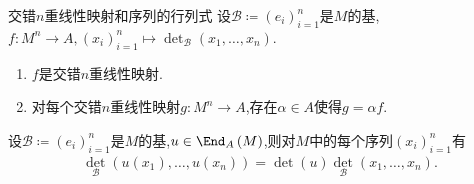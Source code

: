 \begin{proposition}{交错$n$重线性映射和序列的行列式}{}
	设$\mathcal{B}\coloneq\left(e_{i}\right)_{i=1}^{n}$是$M$的基,$f:M^{n}\to A,\left(x_{i}\right)_{i=1}^{n}\mapsto\det_{\mathcal{B}}\left(x_{1},\ldots,x_{n}\right)$.
	\begin{enumerate}
		\item $f$是交错$n$重线性映射.
		\item 对每个交错$n$重线性映射$g:M^{n}\to A$,存在$\alpha\in A$使得$g=\alpha f$.
	\end{enumerate}
\end{proposition}

\begin{proposition}{}{}
	设$\mathcal{B}\coloneq\left(e_{i}\right)_{i=1}^{n}$是$M$的基,$u\in\End_{A}\left(M\right)$,则对$M$中的每个序列$\left(x_{i}\right)_{i=1}^{n}$有
	\begin{align*}
		\det_{\mathcal{B}}\left(u\left(x_{1}\right),\ldots,u\left(x_{n}\right)\right)=\det\left(u\right)\det_{\mathcal{B}}\left(x_{1},\ldots,x_{n}\right).
	\end{align*}
\end{proposition}







